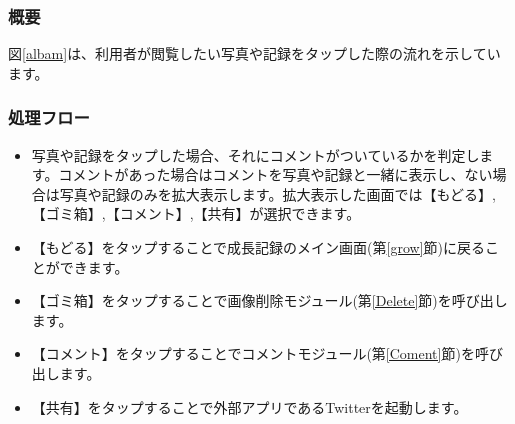 \documentclass[a4j]{jarticle}
\begin{document}
\subsubsection*{概要}
図\ref{albam}は、利用者が閲覧したい写真や記録をタップした際の流れを示しています。

\subsubsection*{処理フロー}
\begin{itemize}
\item 写真や記録をタップした場合、それにコメントがついているかを判定します。コメントがあった場合はコメントを写真や記録と一緒に表示し、ない場合は写真や記録のみを拡大表示します。拡大表示した画面では【もどる】,【ゴミ箱】,【コメント】,【共有】が選択できます。
\item 【もどる】をタップすることで成長記録のメイン画面(第\ref{grow}節)に戻ることができます。
\item 【ゴミ箱】をタップすることで画像削除モジュール(第\ref{Delete}節)を呼び出します。
\item 【コメント】をタップすることでコメントモジュール(第\ref{Coment}節)を呼び出します。
\item 【共有】をタップすることで外部アプリであるTwitterを起動します。
\end{itemize}
\end{document}
